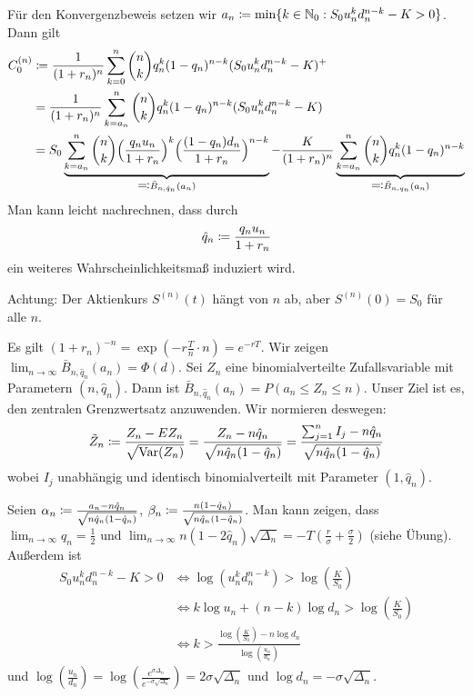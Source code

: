 \documentclass[a4paper,twoside,DIV15,BCOR12mm]{scrbook}
\DeclareMathOperator{\Var}{Var}
\begin{document}
\begin{beweis}
Für den Konvergenzbeweis setzen wir $a_n \da \min \{k \in\MdN_0: S_0 u_n^k d_n^{n-k} - K > 0\}$. Dann gilt
\begin{align*}
C_0^{(n)} &\da \frac 1{(1+r_n)^n} \sum_{k=0}^n \binom n k q_n^k(1-q_n)^{n-k} (S_0 u_n^k d_n^{n-k} - K)^+ \\
&= \frac 1{(1+r_n)^n} \sum_{k=a_n}^n \binom n k q_n^k(1-q_n)^{n-k} (S_0 u_n^k d_n^{n-k} - K) \\
&= S_0 \underbrace{\sum_{k=a_n}^n \binom n k \Big(\frac{q_nu_n}{1+r_n}\Big)^k \Big(\frac{(1-q_n)d_n}{1+r_n}\Big)^{n-k}}_{\ad \bar B_{n,\hat q_n}(a_n)} - \frac K{(1+r_n)^n} \underbrace{\sum_{k=a_n}^n \binom n k q_n^k (1-q_n)^{n-k}}_{\ad \bar B_{n,q_n}(a_n)}
\end{align*}
Man kann leicht nachrechnen, dass durch
\[
\hat q_n \da \frac{q_nu_n}{1+r_n}
\]
ein weiteres Wahrscheinlichkeitsmaß induziert wird.

Achtung: Der Aktienkurs $S^{(n)}(t)$ hängt von $n$ ab, aber $S^{(n)}(0)=S_0$ für alle $n$.

Es gilt $(1+r_n)^{-n} = \exp(-r \frac T n \cdot n) = e^{-rT}$. Wir zeigen $\lim_{n\to\infty} \bar B_{n,\hat q_n} (a_n) = \Phi(d)$. Sei $Z_n$ eine binomialverteilte Zufallsvariable mit Parametern $(n,\hat q_n)$. Dann ist 
$\bar B_{n,\hat q_n} (a_n) = P(a_n \le Z_n \le n)$. Unser Ziel ist es, den zentralen Grenzwertsatz anzuwenden. Wir normieren deswegen: 
\[
\tilde Z_n \da \frac{Z_n - EZ_n}{\sqrt{\Var(Z_n)}} = \frac{Z_n - n\hat q_n}{\sqrt{n \hat q_n (1-\hat q_n)}} = \frac{\sum_{j=1}^n I_j - n\hat q_n}{\sqrt{n \hat q_n (1-\hat q_n)}}
\]
wobei $I_j$ unabhängig und identisch binomialverteilt mit Parameter $(1,\hat q_n)$.

Seien $\alpha_n \da \frac{a_n - n\hat q_n}{\sqrt{n \hat q_n (1-\hat q_n)}}$, $\beta_n \da \frac{n(1-\hat q_n)}{\sqrt{n \hat q_n (1-\hat q_n)}}$. Man kann zeigen, dass $\lim_{n\to\infty} q_n = \frac 12$ und $\lim_{n\to \infty} n(1-2\hat q_n)\sqrt{\Delta_n} = -T (\frac r\sigma + \frac \sigma 2)$ (siehe Übung). Außerdem ist 
\begin{align*}
S_0 u_n^k d_n^{n-k} - K > 0 &\iff \log(u_n^k d_n^{n-k}) > \log (\frac K {S_0}) \\
&\iff k \log u_n + (n-k)\log d_n > \log (\frac K {S_0})\\
&\iff k > \frac{\log(\frac K {S_0}) - n \log d_n}{\log(\frac{u_n}{d_n})} 
\end{align*}
und $\log (\frac{u_n}{d_n}) = \log(\frac{e^{\sigma{\Delta_n}}}{e^{-\sigma\sqrt{\Delta_n}}}) = 2 \sigma \sqrt{\Delta_n}$ und $\log d_n = - \sigma \sqrt{\Delta_n}$.


\end{beweis}
\end{document}
